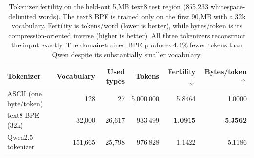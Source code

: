 \begin{table}[t]
  \centering
  \small
  \caption{Tokenizer fertility on the held-out 5,MB text8 test region
  (855{,}233 whitespace-delimited words). The text8 BPE is trained only on the
  first 90,MB with a 32k vocabulary. Fertility is tokens/word (lower is
  better), while bytes/token is its compression-oriented inverse (higher is
  better). All three tokenizers reconstruct the input exactly. The domain-trained
  BPE produces 4.4\% fewer tokens than Qwen despite its substantially smaller
  vocabulary.}
  \label{tab:tokenizer-fertility}
  \begin{tabular}{@{}lrrrrr@{}}
    \toprule
    Tokenizer & Vocabulary & Used types & Tokens & Fertility $\downarrow$ & Bytes/token $\uparrow$ \\
    \midrule
    ASCII (one byte/token) & 128 & 27 & 5{,}000{,}000 & 5.8464 & 1.0000 \\
    text8 BPE (32k) & 32{,}000 & 26{,}617 & 933{,}499 & \textbf{1.0915} & \textbf{5.3562} \\
    Qwen2.5 tokenizer & 151{,}665 & 25{,}798 & 976{,}828 & 1.1422 & 5.1186 \\
    \bottomrule
  \end{tabular}
\end{table}
